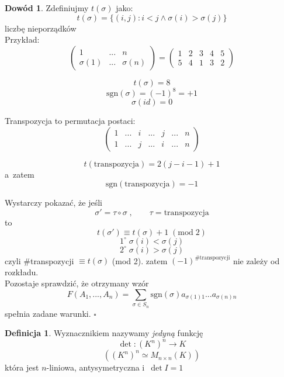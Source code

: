 \documentclass[12pt,a4paper]{article}
\renewcommand{\qed}{$\square$}
\theoremstyle{plain}
\theoremstyle{definition}
\theoremstyle{definition}
\newtheorem{df}{Definicja}[section]
\theoremstyle{definition}
\theoremstyle{definition}
\newtheorem*{dd}{Dowód}
\theoremstyle{definition}
\theoremstyle{definition}
\theoremstyle{definition}
\theoremstyle{definition}
\theoremstyle{definition}
\begin{document}
\begin{dd}
    Zdefiniujmy $t(\sigma)$ jako:
  \[t(\sigma)=\{(i,j): i<j \land \sigma(i)>\sigma(j)\}\]
  liczbę nieporządków\\
  Przykład:
  \[\begin{pmatrix}1&...&n\\\sigma(1)&...&\sigma(n)\end{pmatrix}
    =\begin{pmatrix}1&2&3&4&5\\5&4&1&3&2\end{pmatrix}\]

  \[t(\sigma) = 8\]
  \[\mathrm{sgn}(\sigma) = (-1)^8 = +1\]
  \[\sigma(id) = 0\]

  Transpozycja to permutacja postaci:
  \[\begin{pmatrix}
    1&...&i&...&j&...&n\\
    1&...&j&...&i&...&n
  \end{pmatrix}\]

  \[t(\mathrm{transpozycja})=2(j-i-1)+1\]
  a~zatem
  \[\mathrm{sgn}(\mathrm{transpozycja})=-1\]

  Wystarczy pokazać, że jeśli
  \[\sigma' = \tau \circ \sigma\;,\qquad \tau=\mathrm{transpozycja}\]
  to
  \[t(\sigma') \equiv t(\sigma)+1 \;(\mathrm{mod}\; 2)\]
  \[1^\circ\; \sigma(i) < \sigma(j)\]
  \[2^\circ\; \sigma(i) > \sigma(j)\]
  czyli \#transpozycji $\equiv t(\sigma)$ (mod 2).
  zatem $(-1)^{\#\mathrm{transpozycji}}$ nie zależy od rozkładu.\\
  Pozostaje sprawdzić, że otrzymany wzór
  \[F(A_1, ..., A_n)=\sum_{\sigma \in S_n}\mathrm{sgn}(\sigma)a_{\sigma(1)1}...a_{\sigma(n)n}\]
  spełnia zadane warunki. \qed
\end{dd}

\begin{df}
    Wyznacznikiem nazywamy \textit{jedyną} funkcję
  \[\det: (K^n)^n \rightarrow K\]
  \[\left((K^n)^n \simeq M_{n \times n}(K)\right)\]
  która jest $n$-liniowa, antysymetryczna i~$\det I=1$
\end{df}
\end{document}
